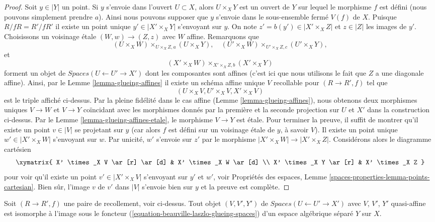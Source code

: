 \begin{proof}
\medskip\noindent
Soit $y \in |Y|$ un point. Si $y$ s'envoie dans l'ouvert $U \subset X$,
alors $U \times_X Y$ est un ouvert de $Y$ sur lequel le morphisme $f$
est défini (nous pouvons simplement prendre $a$).
Ainsi nous pouvons supposer que $y$ s'envoie dans le sous-ensemble fermé
$V(f)$ de $X$. Puisque $R/fR = R'/fR'$ il existe un point unique
$y' \in |X' \times_X Y|$ s'envoyant sur $y$. On note
$z' = b(y') \in |X' \times_X Z|$ et $z \in |Z|$ les images de $y'$.
Choisissons un voisinage \'etale $(W, w) \to (Z, z)$
avec $W$ affine. Remarquons que
$$
(U \times_X W) \times_{U \times_X Z, a} (U \times_X Y),\quad
(U' \times_X W) \times_{U' \times_X Z, c} (U' \times_X Y),
$$
et
$$
(X' \times_X W) \times_{X' \times_X Z, b} (X' \times_X Y)
$$
forment un objet de $\textit{Spaces}(U \leftarrow U' \to X')$
dont les composantes sont affines (c'est ici que nous utilisons le fait que $Z$ a une diagonale affine).
Ainsi, par le Lemme \ref{lemma-glueing-affines}
il existe un schéma affine unique $V$ recollable pour $(R \to R', f)$ tel que
$$
(U \times_X V, U' \times_X V, X' \times_X V)
$$
est le triple affiché ci-dessus. Par la pleine fidélité dans le cas affine (Lemme \ref{lemma-glueing-affines}), nous obtenons deux morphismes uniques $V \to W$ et $V \to Y$ coïncidant avec les morphismes donnés par la première et la seconde projection sur $U$ et $X'$ dans la construction ci-dessus. Par le Lemme \ref{lemma-glueing-affines-etale}, le morphisme $V \to Y$ est \'etale. Pour terminer la preuve, il suffit de montrer qu'il existe un point $v \in |V|$ se projetant sur $y$ (car alors $f$ est défini sur un voisinage \'etale de $y$, à savoir $V$). Il existe un point unique $w' \in |X' \times_X W|$ s'envoyant sur $w$. Par unicité, $w'$ s'envoie sur $z'$ par le morphisme $|X' \times_X W| \to |X' \times_X Z|$. Considérons alors le diagramme cartésien $$
\xymatrix{
X' \times_X V \ar[r] \ar[d] & X' \times_X W \ar[d] \\
X' \times_X Y \ar[r] & X' \times_X Z
}
$$
pour voir qu'il existe un point $v' \in |X' \times_X V|$ s'envoyant sur $y'$ et $w'$, voir Propriétés des espaces, Lemme \ref{spaces-properties-lemma-points-cartesian}. Bien sûr, l'image $v$ de $v'$ dans $|V|$ s'envoie bien sur $y$ et la preuve est complète. 
\end{proof}

\begin{lemma}
\label{lemma-glueing-quasi-affines}
Soit $(R \to R', f)$ une paire de recollement, voir ci-dessus. Tout objet
$(V, V', Y')$ de $\textit{Spaces}(U \leftarrow U' \to X')$
avec $V$, $V'$, $Y'$ quasi-affine est isomorphe à
l'image sous le foncteur (\ref{equation-beauville-laszlo-glueing-spaces})
d'un espace algébrique séparé $Y$ sur $X$.
\end{lemma}

